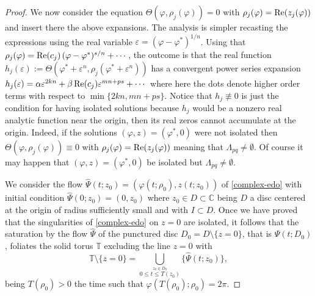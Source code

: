 \documentclass[12pt]{amsart}
\begin{document}
\begin{proof}
We now consider the equation $\Theta(\varphi, \rho_j(\varphi)) = 0$ with $\rho_j(\varphi) = {\rm Re}(z_j(\varphi))$ and insert there the above expansions. The analysis is simpler recasting the expressions using the real variable $\varepsilon = (\varphi-\varphi^*)^{1/n}$. Using that $\rho_j(\varphi) = {\rm Re}(c_j) \, (\varphi-\varphi^*)^{s/n} + \cdots$, the outcome is that the real function $h_j(\varepsilon) := \Theta(\varphi^* + \varepsilon^n, \rho_j(\varphi^* + \varepsilon^n))$ has a convergent power series expansion $h_j(\varepsilon) = \alpha \varepsilon^{2 k n} + \beta \, {\rm Re}(c_j) \varepsilon^{m n+p s} + \cdots$ where here the dots denote higher order terms with respect to $\min\{2 k n, m n+p s \}$. Notice that $h_j \not\equiv 0$ is just the condition for having isolated solutions because $h_j$ would be a nonzero real analytic function near the origin, then its real zeros cannot accumulate at the origin. Indeed, if the solutions $(\varphi, z) = (\varphi^*, 0)$ were not isolated then $\Theta(\varphi, \rho_j(\varphi)) \equiv 0$ with $\rho_j(\varphi) = {\rm Re}(z_j(\varphi))$ meaning that $\Lambda_{pq} \neq \emptyset$. Of course it may happen that $(\varphi, z) = (\varphi^*, 0)$ be isolated but $\Lambda_{pq} \neq \emptyset$.
\newline

We consider the flow $\hat\Psi(t; z_0) = (\varphi(t; \rho_0), z(t; z_0))$ of \eqref{complex-edo} with initial condition $\hat\Psi(0; z_0) = (0, z_0)$ where $z_0 \in D \subset \mathbb{C}$ being $D$ a disc centered at the origin of radius sufficiently small and with $I \subset D$. Once we have proved that the singularities of \eqref{complex-edo} on $z=0$ are isolated, it follows that the saturation by the flow $\hat\Psi$ of the punctured disc $D_0 = D \setminus \{z=0\}$, that is $\hat\Psi(t; D_0)$, foliates the solid torus $\mathbb{T}$ excluding the line $z=0$ with
$$
\mathbb{T} \setminus \{z=0\} = \bigcup_{\stackrel{z_0 \in D_0}{\scriptscriptstyle 0 \leq t \leq T(z_0)}} \{  \hat\Psi(t; z_0) \},
$$
being $T(\rho_0) > 0$ the time such that $\varphi(T(\rho_0); \rho_0) = 2 \pi$.


\end{proof}
\end{document}
